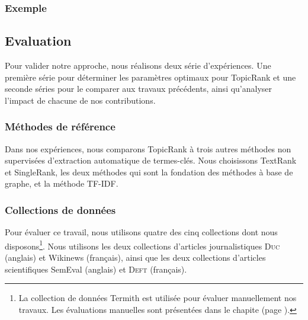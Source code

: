       \subsubsection{Exemple}
      \label{subsubsec:main-automatic_keyphrase_annotation-unsupervised_automatic_keyphrase_extraction-topicrank-example}

    \subsection{Evaluation}
    \label{subsec:main-automatic_keyphrase_annotation-unsupervised_automatic_keyphrase_extraction-evaluation}
      Pour valider notre approche, nous réalisons deux série d'expériences. Une
      première série pour déterminer les paramètres optimaux pour TopicRank et
      une seconde séries pour le comparer aux travaux précédents, ainsi
      qu'analyser l'impact de chacune de nos contributions.
      
      \subsubsection{Méthodes de référence}
      \label{subsubsec:main-automatic_keyphrase_annotation-unsupervised_automatic_keyphrase_extraction-evaluation-baselines}
        Dans nos expériences, nous comparons TopicRank à trois autres
        méthodes non supervisées d'extraction automatique de termes-clés. Nous
        choisissons TextRank et SingleRank, les deux méthodes qui sont la
        fondation des méthodes à base de graphe, et la méthode TF-IDF.

      \subsubsection{Collections de données}
      \label{subsubsec:main-automatic_keyphrase_annotation-unsupervised_automatic_keyphrase_extraction-evaluation-evaluation_data}
        Pour évaluer ce travail, nous utilisons quatre des cinq collections dont
        nous disposons\footnote{La collection de données Termith est utilisée
        pour évaluer manuellement nos travaux. Les évaluations manuelles sont
        présentées dans le chapite  (page \TODO{}).}. Nous utilisons les
        deux collections d'articles journalistiques \textsc{Duc} (anglais) et
        Wikinews (français), ainsi que les deux collections d'articles
        scientifiques SemEval (anglais) et \textsc{Deft} (français).

